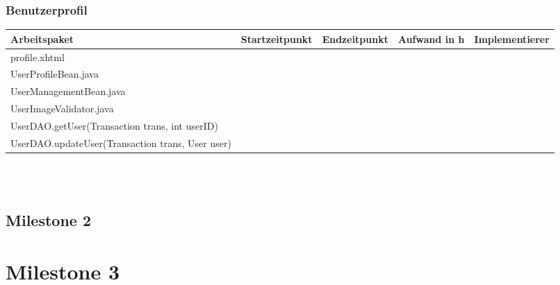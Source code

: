 \documentclass[12pt,a4paper]{scrreprt}
\begin{document}
\begin{landscape}
   	\subsection{Benutzerprofil}
   	\begin{tabular}{|p{10cm}|p{4cm}|p{3cm}|p{3cm}|p{3cm}|}
   		\hline  \textbf{Arbeitspaket} & \textbf{Startzeitpunkt} & \textbf{Endzeitpunkt} & \textbf{Aufwand in h} & \textbf{Implementierer} \\ 
   		\hline   profile.xhtml                                         &                            &                             &                     &\\
   		\hline   UserProfileBean.java                                  &                            &                             &                     &\\
   		\hline   UserManagementBean.java                               &                            &                             &                     &\\
   		\hline   UserImageValidator.java                               &                            &                             &                     &\\ 
   		\hline   UserDAO.getUser(Transaction trans, int userID)        &                            &                             &                     &\\ 
   		\hline   UserDAO.updateUser(Transaction trans, User user)      &                            &                             &                     &\\ 
   		\hline 
   	\end{tabular} \ \\
   	\ \\
    \end{landscape}

		

\begin{landscape}
	\section{Milestone 2}
\end{landscape}

	
	
	\chapter*{Milestone 3}
	
\end{document}
